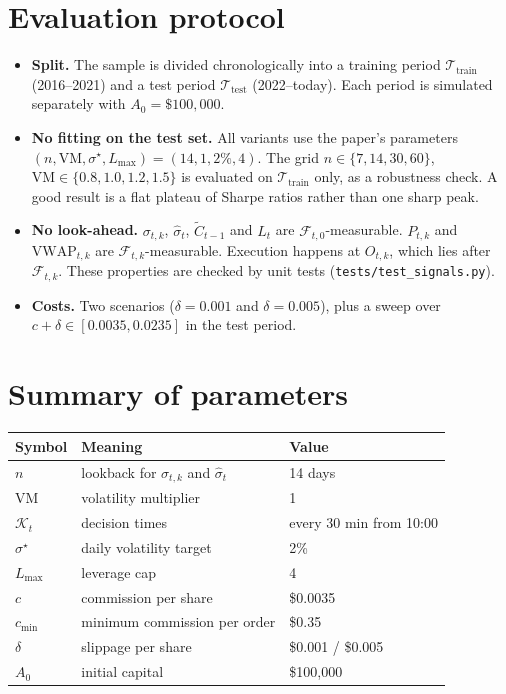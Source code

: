 \documentclass[11pt,a4paper]{article}
\newcommand{\VWAP}{\mathrm{VWAP}}
\newcommand{\1}{\mathbf{1}}
\begin{document}
\section{Evaluation protocol}

\begin{itemize}
  \item \textbf{Split.} The sample is divided chronologically into a training period $\mathcal T_{\text{train}}$
        (2016--2021) and a test period $\mathcal T_{\text{test}}$ (2022--today). Each period is simulated
        separately with $A_0 = \$100{,}000$.
  \item \textbf{No fitting on the test set.} All variants use the paper's parameters
        $(n, \mathrm{VM}, \sigma^\star, L_{\max}) = (14, 1, 2\%, 4)$. The grid
        $n\in\{7,14,30,60\}$, $\mathrm{VM}\in\{0.8,1.0,1.2,1.5\}$ is evaluated on $\mathcal T_{\text{train}}$ only,
        as a robustness check. A good result is a flat plateau of Sharpe ratios rather than one sharp peak.
  \item \textbf{No look-ahead.} $\sigma_{t,k}$, $\hat\sigma_t$, $\tilde C_{t-1}$ and $L_t$ are
        $\mathcal F_{t,0}$-measurable. $P_{t,k}$ and $\VWAP_{t,k}$ are $\mathcal F_{t,k}$-measurable.
        Execution happens at $O_{t,k}$, which lies after $\mathcal F_{t,k}$. These properties are checked by
        unit tests (\texttt{tests/test\_signals.py}).
  \item \textbf{Costs.} Two scenarios ($\delta = 0.001$ and $\delta = 0.005$), plus a sweep over
        $c+\delta \in [0.0035, 0.0235]$ in the test period.
\end{itemize}

\section{Summary of parameters}

\begin{center}
\begin{tabular}{lll}
\toprule
Symbol & Meaning & Value \\
\midrule
$n$ & lookback for $\sigma_{t,k}$ and $\hat\sigma_t$ & 14 days \\
$\mathrm{VM}$ & volatility multiplier & 1 \\
$\mathcal K_t$ & decision times & every 30 min from 10:00 \\
$\sigma^\star$ & daily volatility target & 2\% \\
$L_{\max}$ & leverage cap & 4 \\
$c$ & commission per share & \$0.0035 \\
$c_{\min}$ & minimum commission per order & \$0.35 \\
$\delta$ & slippage per share & \$0.001 / \$0.005 \\
$A_0$ & initial capital & \$100{,}000 \\
\bottomrule
\end{tabular}
\end{center}
\end{document}
